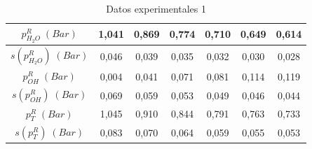 \documentclass[a4paper,12pt,titlepage]{article}
\begin{document}
\begin{table}[h!]
\begin{tabular}{|c|c|c|c|c|c|c|}
$p_{H_2O}^R \;(Bar)$         & 1,041  & 0,869  & 0,774  & 0,710  & 0,649  & 0,614  \\ \hline
$s(p_{H_2O}^R) \;(Bar)$      & 0,046  & 0,039  & 0,035  & 0,032  & 0,030  & 0,028  \\ \hline
$p_{OH}^R \;(Bar)$           & 0,004  & 0,041  & 0,071  & 0,081  & 0,114  & 0,119  \\ \hline
$s(p_{OH}^R) \;(Bar)$        & 0,069  & 0,059  & 0,053  & 0,049  & 0,046  & 0,044  \\ \hline
$p_{T}^R \;(Bar)$            & 1,045  & 0,910  & 0,844  & 0,791  & 0,763  & 0,733  \\ \hline
$s(p_{T}^R) \;(Bar)$         & 0,083  & 0,070  & 0,064  & 0,059  & 0,055  & 0,053  \\ \hline
\end{tabular}
\caption{Datos experimentales 1}
\label{tab:my-table}
\end{table}

\newpage
\end{document}
